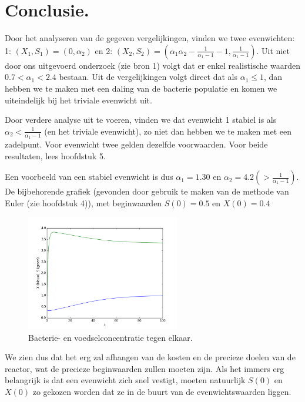 
\chapter{Conclusie.}
Door het analyseren van de gegeven vergelijkingen, vinden we twee evenwichten: 1: $(X_1, S_1) = (0, \alpha_2)$ en 2: $(X_2, S_2) = \left( \alpha_1\alpha_2 - \frac{1}{\alpha_1 - 1} - 1, \frac{1}{\alpha_1 - 1}\right)$. Uit niet door ons uitgevoerd onderzoek (zie bron 1) volgt dat er enkel realistische waarden $0.7< \alpha_1 < 2.4$ bestaan. Uit de vergelijkingen volgt direct dat als $\alpha_1 \leq 1$, dan hebben we te maken met een daling van de bacterie populatie en komen we uiteindelijk bij het triviale evenwicht uit. 

Door verdere analyse uit te voeren, vinden we dat evenwicht 1 stabiel is als $\alpha_2 < \frac{1}{\alpha_1 - 1}$ (en het triviale evenwicht), zo niet dan hebben we te maken met een zadelpunt. Voor evenwicht twee gelden dezelfde voorwaarden. Voor beide resultaten, lees hoofdstuk 5. 

Een voorbeeld van een stabiel evenwicht is dus $\alpha_1 = 1.30$ en $\alpha_2 = 4.2 (> \frac{1}{\alpha_1 - 1})$. De bijbehorende grafiek (gevonden door gebruik te maken van de methode van Euler (zie hoofdstuk 4)), met beginwaarden $S(0) = 0.5$ en $X(0) = 0.4$

\begin{figure}[h]
	\centering
	\includegraphics[width=0.6\textwidth]{../images/figure_5.png}
	\caption{Bacterie- en voedselconcentratie tegen elkaar.}
\end{figure}

We zien dus dat het erg zal afhangen van de kosten en de precieze doelen van de reactor, wat de precieze beginwaarden zullen moeten zijn. Als het immers erg belangrijk is dat een evenwicht zich snel vestigt, moeten natuurlijk $S(0)$ en $X(0)$ zo gekozen worden dat ze in de buurt van de evenwichtswaarden liggen. 